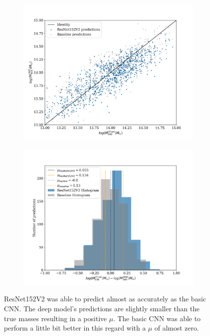 \begin{figure}[H]
\begin{subfigure}{.5\textwidth}
    \centering
    \includegraphics[width=\linewidth]{images/Chapter4/Results/test_ResNet152V2_scatter.png}
    \label{fig:test_ResNet152V2_scatter}
\end{subfigure}
\begin{subfigure}{.5\textwidth}
    \centering
    \includegraphics[width=\linewidth]{images/Chapter4/Results/test_ResNet152V2_hist.png}
    \label{fig:test_ResNet152V2_hist}
\end{subfigure}
\label{fig:res52v2_all}
\caption{ResNet152V2 was able to predict almost as accurately as the basic CNN. The deep model's predictions are slightly smaller than the true masses resulting in a positive $\mu$. The basic CNN was able to perform a little bit better in this regard with a $\mu$ of almost zero.}
\end{figure}

